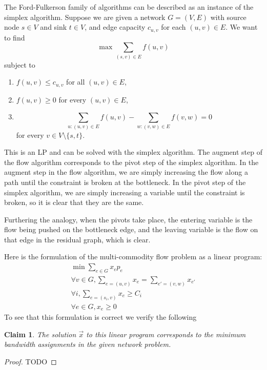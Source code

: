\documentclass{article}
\newcommand{\problem}[1]{\noindent {\bf #1}}
\newcommand{\problempart}[1]{\noindent{\textbf{(#1)}}}
\newtheorem*{claim}{Claim}
\begin{document}
\problem{Problem 1.}

The Ford-Fulkerson family of algorithms can be described as an instance of the simplex algorithm. Suppose we are given a network $G=(V,E)$ with source node $s\in V$ and sink $t\in V$, and edge capacity $c_{u,v}$ for each $(u,v)\in E$. We want to find
\[\max \sum_{(s,v)\in E} f(u,v)\]
subject to
\begin{enumerate}
\item $f(u,v)\leq c_{u,v}$ for all $(u,v)\in E$,
\item $f(u,v)\geq 0$ for every $(u,v)\in E$,
\item
\[\sum_{u:(u,v)\in E} f(u,v) - \sum_{w:(v,w)\in E} f(v,w) = 0\]
for every $v\in V\setminus\{s,t\}$.
\end{enumerate}

This is an LP and can be solved with the simplex algorithm. The augment step of the flow algorithm corresponds to the pivot step of the simplex algorithm. In the augment step in the flow algorithm, we are simply increasing the flow along a path until the constraint is broken at the bottleneck. In the pivot step of the simplex algorithm, we are simply increasing a variable until the constraint is broken, so it is clear that they are the same.

Furthering the analogy, when the pivots take place, the entering variable is the flow being pushed on the bottleneck edge, and the leaving variable is the flow on that edge in the residual graph, which is clear.

\problem{Problem 2.} 

\problempart{a} Here is the formulation of the multi-commodity flow problem as a linear program:
\begin{align*}
\min \sum_{e\in G} x_ep_e \\
\forall v \in G, \sum_{e = (u,v)} x_e = \sum_{e' = (v,w)} x_{e'} \\
\forall i, \sum_{e = (s_i, v)} x_e \geq C_i \\
\forall e \in G, x_e \geq 0
\end{align*}
To see that this formulation is correct we verify the following
\begin{claim}
The solution $\vec{x}$ to this linear program corresponds to the minimum bandwidth assignments in the given network problem. 
\end{claim}
\begin{proof}
TODO
\end{proof}
\end{document}
